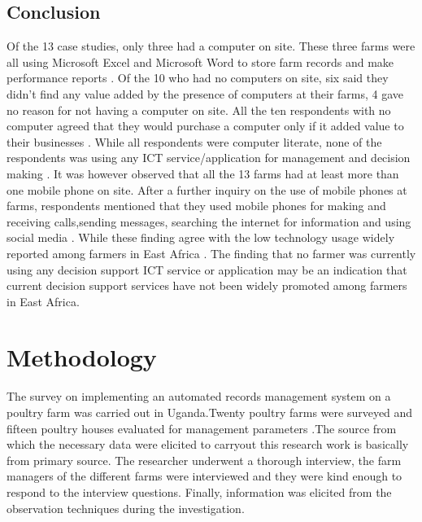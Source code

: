 \documentclass{article}
\begin{document}
\subsection{Conclusion}
Of the 13 case studies, only three  had a computer on site. These three farms were all
using Microsoft Excel and Microsoft Word to store farm records and make performance
reports \cite{r1}. Of the 10 who had no computers on site, six said they didn’t find any value added by the presence of computers at their farms, 4 gave no reason for not having a
computer on site. All the ten respondents  with no computer agreed that they would
purchase a computer only if it added value to their businesses \cite{r1}. While all respondents were computer literate, none of the respondents was using any ICT service/application for management and decision making \cite{r1}. It was however observed that all the 13 farms had at least more than one mobile phone on site. After a further inquiry on the use of mobile phones at farms, respondents mentioned that they used mobile phones for making and receiving calls,sending messages, searching the internet for information and using social media \cite{r1}. While these finding agree with the low technology usage widely reported among farmers in East Africa \cite{r3}. The finding that no farmer was currently using any decision support ICT service or application may be an indication that current decision support services have not been widely promoted among farmers in East Africa.
\section{Methodology}
The survey on implementing an automated records management system on a poultry farm was carried out in Uganda.Twenty poultry farms were surveyed and fifteen poultry houses evaluated for management parameters .The source from which the necessary data were elicited to carryout this research work is basically from primary source. The researcher underwent a thorough interview, the farm managers of the different farms were interviewed and they were kind enough to respond to the interview questions. Finally, information was elicited from the observation techniques during the investigation. 


\end{document}
